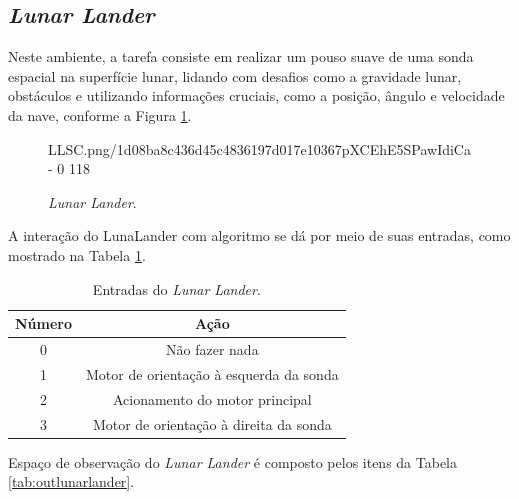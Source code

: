 \documentclass[12pt,           %
a4paper,                       %
openany,                       %
oneside,                       %
chapter=TITLE,                 %
english,                       %
spanish,                       %
brazil,                        %
sumario=tradicional]{abntex2}  %
\begin{document}
\begin{OnehalfSpace}
\subsection{\textit{Lunar Lander}}
\label{sec:LL}

Neste ambiente, a tarefa consiste em realizar um pouso suave de uma sonda espacial na superfície lunar, lidando com desafios como a gravidade lunar, obstáculos e utilizando informações cruciais, como a posição, ângulo e velocidade da nave, conforme a Figura \ref{fig:GPC1}.

\begin{figure}[H]
    \centering
    \vspace*{-0.25cm}
    \caption{\textit{Lunar Lander}.}
    {LLSC.png/1d08ba8c436d45c4836197d017e10367pXCEhE5SPawIdiCa-}%
    {0}%
    {118}%
    \label{fig:GPC1}
\end{figure}
\vspace*{-.725cm}
{\raggedright {}}

A interação do LunaLander com algoritmo se dá por meio de suas entradas, como mostrado na Tabela \ref{tab:intlunarlander}.

\begin{table}[H]
	\centering
	\vspace*{-0.2cm}
	\caption{Entradas do \textit{Lunar Lander}.}
        \begin{tabular}{|c|c|}
        	 \hline
             Número & Ação\\
             \hline
            0 & Não fazer nada \\
            \hline
            1 & Motor de orientação à esquerda da sonda \\
            \hline
            2 & Acionamento do motor principal\\
            \hline
            3 & Motor de orientação à direita da sonda \\
            \hline
            \end{tabular} 
        \label{tab:intlunarlander}                 %
    \end{table}
\vspace*{-.655cm}
{\raggedright {}}

Espaço de observação do \textit{Lunar Lander} é composto pelos itens da Tabela \ref{tab:outlunarlander}.


\end{OnehalfSpace}
\end{document}
